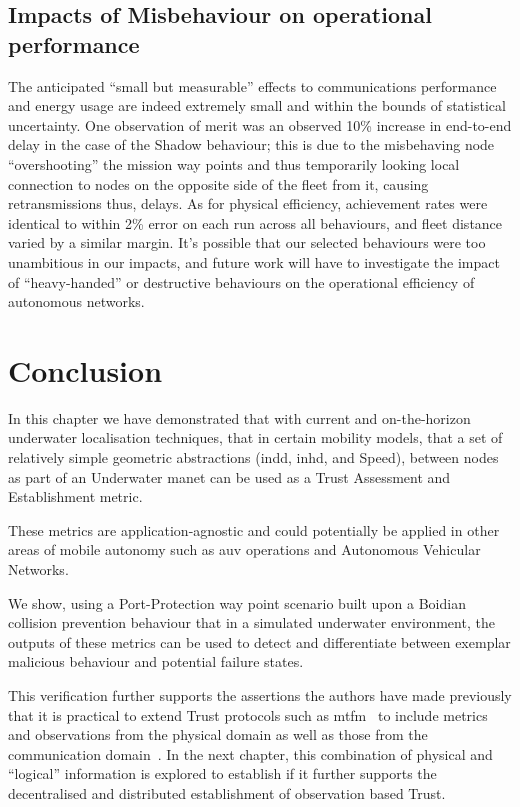 \subsection{Impacts of Misbehaviour on operational performance}
The anticipated ``small but measurable'' effects to communications performance and energy usage are indeed extremely small and within the bounds of statistical uncertainty.
One observation of merit was an observed 10\% increase in end-to-end delay in the case of the Shadow behaviour; this is due to the misbehaving node ``overshooting'' the mission way points and thus temporarily looking local connection to nodes on the opposite side of the fleet from it, causing retransmissions thus, delays.
As for physical efficiency, achievement rates were identical to within 2\% error on each run across all behaviours, and fleet distance varied by a similar margin.
It's possible that our selected behaviours were too unambitious in our impacts, and future work will have to investigate the impact of ``heavy-handed'' or destructive behaviours on the operational efficiency of autonomous networks.

\section{Conclusion}
In this chapter we have demonstrated that with current and on-the-horizon underwater localisation techniques, that in certain mobility models, that a set of relatively simple geometric abstractions (\gls{indd}, \gls{inhd}, and Speed), between nodes as part of an Underwater \gls{manet} can be used as a Trust Assessment and Establishment metric.

These metrics are application-agnostic and could potentially be applied in other areas of mobile autonomy such as \gls{auv} operations and Autonomous Vehicular Networks.

We show, using a Port-Protection way point scenario built upon a Boidian collision prevention behaviour that in a simulated underwater environment, the outputs of these metrics can be used to detect and differentiate between exemplar malicious behaviour and potential failure states.

This verification further supports the assertions the authors have made previously that it is practical to extend Trust protocols such as \gls{mtfm}~\cite{Guo2012} to include metrics and observations from the physical domain as well as those from the communication domain~\cite{Bolster2014}.
In the next chapter, this combination of physical and ``logical'' information is explored to establish if it further supports the decentralised and distributed establishment of observation based Trust.

